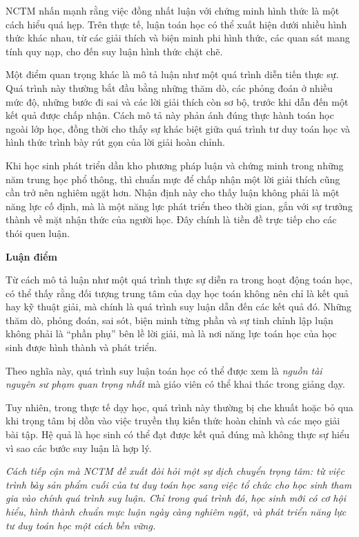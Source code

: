 \documentclass[
  10pt,
  a4paper,
  landscape,
  twoside,
  openany
]{scrbook}
\newcommand{\NOTE}[1]{#1}
\begin{document}
{
\NOTE{NCTM nhấn mạnh rằng việc đồng nhất luận với chứng minh hình thức là một cách hiểu quá hẹp. Trên thực tế, luận toán học có thể xuất hiện dưới nhiều hình thức khác nhau, từ các giải thích và biện minh phi hình thức, các quan sát mang tính quy nạp, cho đến suy luận hình thức chặt chẽ.

Một điểm quan trọng khác là mô tả luận như một quá trình diễn tiến thực sự. Quá trình này thường bắt đầu bằng những thăm dò, các phỏng đoán ở nhiều mức độ, những bước đi sai và các lời giải thích còn sơ bộ, trước khi dẫn đến một kết quả được chấp nhận. Cách mô tả này phản ánh đúng thực hành toán học ngoài lớp học, đồng thời cho thấy sự khác biệt giữa quá trình tư duy toán học và hình thức trình bày rút gọn của lời giải hoàn chỉnh.

Khi học sinh phát triển dần kho phương pháp luận và chứng minh trong những năm trung học phổ thông, thì chuẩn mực để chấp nhận một lời giải thích cũng cần trở nên nghiêm ngặt hơn. Nhận định này cho thấy luận không phải là một năng lực cố định, mà là một năng lực phát triển theo thời gian, gắn với sự trưởng thành về mặt nhận thức của người học. Đây chính là tiền đề trực tiếp cho các thói quen luận.

\vspace{.3\baselineskip}
\noindent
\textbf{Luận điểm}

Từ cách mô tả luận như một quá trình thực sự diễn ra trong hoạt động toán học, có thể thấy rằng đối tượng trung tâm của dạy học toán không nên chỉ là kết quả hay kỹ thuật giải, mà chính là quá trình suy luận dẫn đến các kết quả đó. Những thăm dò, phỏng đoán, sai sót, biện minh từng phần và sự tinh chỉnh lập luận không phải là ``phần phụ'' bên lề lời giải, mà là nơi năng lực toán học của học sinh được hình thành và phát triển.

Theo nghĩa này, quá trình suy luận toán học có thể được xem là \emph{nguồn tài nguyên sư phạm quan trọng nhất} mà giáo viên có thể khai thác trong giảng dạy. 

Tuy nhiên, trong thực tế dạy học, quá trình này thường bị che khuất hoặc bỏ qua khi trọng tâm bị dồn vào việc truyền thụ kiến thức hoàn chỉnh và các mẹo giải bài tập. Hệ quả là học sinh có thể đạt được kết quả đúng mà không thực sự hiểu vì sao các bước suy luận là hợp lý.

\emph{Cách tiếp cận mà NCTM đề xuất đòi hỏi một sự dịch chuyển trọng tâm: từ việc trình bày sản phẩm cuối của tư duy toán học sang việc tổ chức cho học sinh tham gia vào chính quá trình suy luận. Chỉ trong quá trình đó, học sinh mới có cơ hội hiểu, hình thành chuẩn mực luận ngày càng nghiêm ngặt, và phát triển năng lực tư duy toán học một cách bền vững.}

}}
\end{document}
